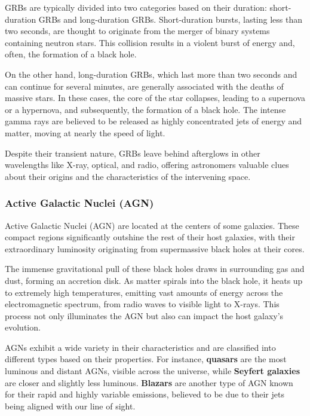 GRBs are typically divided into two categories based on their duration: short-duration GRBs and long-duration GRBs. Short-duration bursts, lasting less than two seconds, are thought to originate from the merger of binary systems containing neutron stars. This collision results in a violent burst of energy and, often, the formation of a black hole.

On the other hand, long-duration GRBs, which last more than two seconds and can continue for several minutes, are generally associated with the deaths of massive stars. In these cases, the core of the star collapses, leading to a supernova or a hypernova, and subsequently, the formation of a black hole. The intense gamma rays are believed to be released as highly concentrated jets of energy and matter, moving at nearly the speed of light.

Despite their transient nature, GRBs leave behind afterglows in other wavelengths like X-ray, optical, and radio, offering astronomers valuable clues about their origins and the characteristics of the intervening space.

\subsubsection{Active Galactic Nuclei (AGN)}

Active Galactic Nuclei (AGN) are located at the centers of some galaxies. These compact regions significantly outshine the rest of their host galaxies, with their extraordinary luminosity originating from supermassive black holes at their cores.

The immense gravitational pull of these black holes draws in surrounding gas and dust, forming an accretion disk. As matter spirals into the black hole, it heats up to extremely high temperatures, emitting vast amounts of energy across the electromagnetic spectrum, from radio waves to visible light to X-rays. This process not only illuminates the AGN but also can impact the host galaxy's evolution.

AGNs exhibit a wide variety in their characteristics and are classified into different types based on their properties. For instance,\textbf{ quasars} are the most luminous and distant AGNs, visible across the universe, while \textbf{Seyfert galaxies} are closer and slightly less luminous. \textbf{Blazars} are another type of AGN known for their rapid and highly variable emissions, believed to be due to their jets being aligned with our line of sight.

